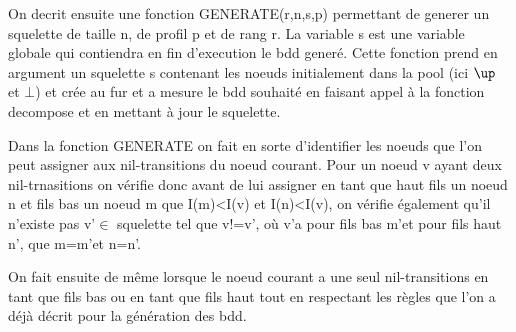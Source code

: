 \documentclass[french]{article}
\begin{document}
On decrit ensuite une fonction GENERATE(r,n,s,p) permettant de generer un squelette de taille n, de profil p et de rang r. La variable s est une variable globale qui contiendra en fin d'execution le bdd generé.
Cette fonction prend en argument un squelette s contenant les noeuds initialement dans la pool (ici \(\up\) et \(\bot\)) et crée au fur et a mesure le bdd souhaité en faisant appel à la fonction decompose et en mettant à jour le squelette.

\begin{algorithm}
  \begin{algorithmic}[1]
    \Statex
            \State {}
                \State {}
                \State {}
            \EndIf
            \Else
                \State {}
                \State {}
                        \EndIf
                    \Else
                        \State {}
                \EndIf
            \EndIf
            \State {}
            \State {}
  \end{algorithmic}
\end{algorithm}


Dans la fonction GENERATE on fait en sorte d'identifier les noeuds que l'on peut assigner aux nil-transitions du noeud courant. Pour un noeud v ayant deux nil-trnasitions on vérifie donc avant de lui assigner en tant que haut fils un noeud n et fils bas un noeud m que I(m)<I(v) et I(n)<I(v), on vérifie également qu'il n'existe pas v\textquoteright \(\in\) squelette tel que v!=v\textquoteright, où v\textquoteright a pour fils bas m\textquoteright et pour fils haut n\textquoteright, que m=m\textquoteright et n=n\textquoteright.

On fait ensuite de même lorsque le noeud courant a une seul nil-transitions en tant que fils bas ou en tant que fils haut tout en respectant les règles que l'on a déjà décrit pour la génération des bdd. 
\end{document}
